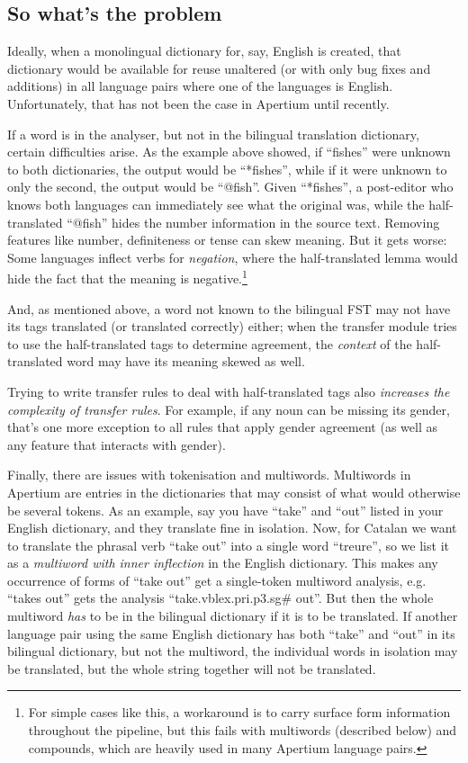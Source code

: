 \documentclass[11pt]{article}
\begin{document}
\subsection{So what's the problem}

Ideally, when a monolingual dictionary for, say, English is created,
that dictionary would be available for reuse unaltered (or with only
bug fixes and additions) in all language pairs where one of the
languages is English. Unfortunately, that has not been the case in
Apertium until recently.

If a word is in the analyser, but not in the bilingual translation
dictionary, certain difficulties arise. As the example above showed,
if ``fishes'' were unknown to both dictionaries, the output would be
``*fishes'', while if it were unknown to only the second, the output
would be ``@fish''. Given ``*fishes'', a post-editor who knows both
languages can immediately see what the original was, while the
half-translated ``@fish'' hides the number information in the source
text. Removing features like number, definiteness or tense can skew
meaning.  But it gets worse: Some languages inflect verbs for
\emph{negation}, where the half-translated lemma would hide the fact
that the meaning is negative.\footnote{For simple cases like this, a
    workaround is to carry surface form information throughout the
    pipeline, but this fails with multiwords (described below) and
    compounds, which are heavily used in many Apertium language
    pairs.}

And, as mentioned above, a word not known to the bilingual FST may not
have its tags translated (or translated correctly) either; when the
transfer module tries to use the half-translated tags to determine
agreement, the \emph{context} of the half-translated word may have its
meaning skewed as well.

Trying to write transfer rules to deal with half-translated tags also
\emph{increases the complexity of transfer rules}. For example, if any
noun can be missing its gender, that's one more exception to all rules
that apply gender agreement (as well as any feature that interacts with
gender).

Finally, there are issues with tokenisation and multiwords.
Multiwords in Apertium are entries in the dictionaries that may
consist of what would otherwise be several tokens. As an example, say
you have ``take'' and ``out'' listed in your English dictionary, and
they translate fine in isolation. Now, for Catalan we want to
translate the phrasal verb ``take out'' into a single word ``treure'',
so we list it as a \emph{multiword with inner inflection} in the
English dictionary. This makes any occurrence of forms of ``take out''
get a single-token multiword analysis, e.g. ``takes out'' gets the
analysis ``take.vblex.pri.p3.sg\# out''. But then the whole multiword
\emph{has} to be in the bilingual dictionary if it is to be
translated. If another language pair using the same English dictionary
has both ``take'' and ``out'' in its bilingual dictionary, but not the
multiword, the individual words in isolation may be translated, but
the whole string together will not be translated.
\end{document}
